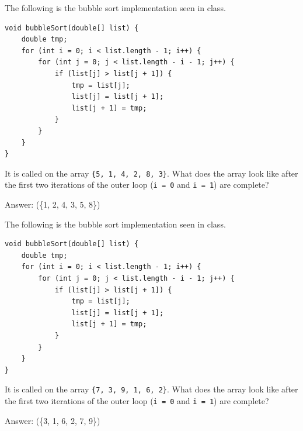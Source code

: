 

\begin{question}
The following is the bubble sort implementation seen in class.

\begin{lstlisting}
void bubbleSort(double[] list) {
    double tmp;
    for (int i = 0; i < list.length - 1; i++) {
        for (int j = 0; j < list.length - i - 1; j++) {
            if (list[j] > list[j + 1]) {
                tmp = list[j];
                list[j] = list[j + 1];
                list[j + 1] = tmp;
            }
        }
    }
}
\end{lstlisting}

It is called on the array \lstinline|{5, 1, 4, 2, 8, 3}|.
What does the array look like after the first two iterations of the outer loop (\lstinline|i = 0| and \lstinline|i = 1|) are complete?

Answer: \underline{\hspace{2in}} \ifanswers (\{1, 2, 4, 3, 5, 8\})\fi
\end{question}

\begin{question}
The following is the bubble sort implementation seen in class.

\begin{lstlisting}
void bubbleSort(double[] list) {
    double tmp;
    for (int i = 0; i < list.length - 1; i++) {
        for (int j = 0; j < list.length - i - 1; j++) {
            if (list[j] > list[j + 1]) {
                tmp = list[j];
                list[j] = list[j + 1];
                list[j + 1] = tmp;
            }
        }
    }
}
\end{lstlisting}

It is called on the array \lstinline|{7, 3, 9, 1, 6, 2}|.
What does the array look like after the first two iterations of the outer loop (\lstinline|i = 0| and \lstinline|i = 1|) are complete?

Answer: \underline{\hspace{2in}} \ifanswers (\{3, 1, 6, 2, 7, 9\})\fi
\end{question}


